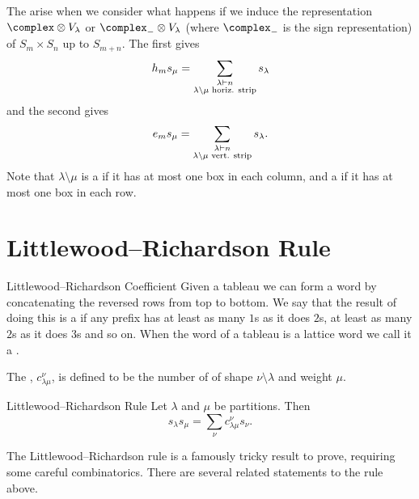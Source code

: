 The  arise when we consider what happens if we induce the representation \(\complex \otimes V_\lambda\) or \(\complex_{-} \otimes V_\lambda\) (where \(\complex_{-}\) is the sign representation) of \(S_m \times S_n\) up to \(S_{m+n}\).
The first gives
\begin{equation}
    h_m s_\mu = \sum_{\substack{\lambda \vdash n\\ \lambda \setminus \mu \text{ horiz. strip}}} s_\lambda
\end{equation}
and the second gives
\begin{equation}
    e_m s_\mu =  \sum_{\substack{\lambda \vdash n\\ \lambda \setminus \mu \text{ vert. strip}}} s_\lambda.
\end{equation}
Note that \(\lambda \setminus \mu\) is a  if it has at most one box in each column, and a  if it has at most one box in each row.

\section{Littlewood--Richardson Rule}
\begin{dfn}{Littlewood--Richardson Coefficient}{}
    Given a tableau we can form a word by concatenating the reversed rows from top to bottom.
    We say that the result of doing this is a  if any prefix has at least as many \(1\)s as it does \(2\)s, at least as many \(2\)s as it does \(3\)s and so on.
    When the word of a tableau is a lattice word we call it a .
    
    The , \(c_{\lambda\mu}^\nu\), is defined to be the number of of shape \(\nu \setminus \lambda\) and weight \(\mu\).
\end{dfn}

\begin{thm}{Littlewood--Richardson Rule}{}
    Let \(\lambda\) and \(\mu\) be partitions.
    Then
    \begin{equation}
        s_\lambda s_\mu = \sum_{\nu} c^\nu_{\lambda\mu} s_\nu.
    \end{equation}
\end{thm}

The Littlewood--Richardson rule is a famously tricky result to prove, requiring some careful combinatorics.
There are several related statements to the rule above.

